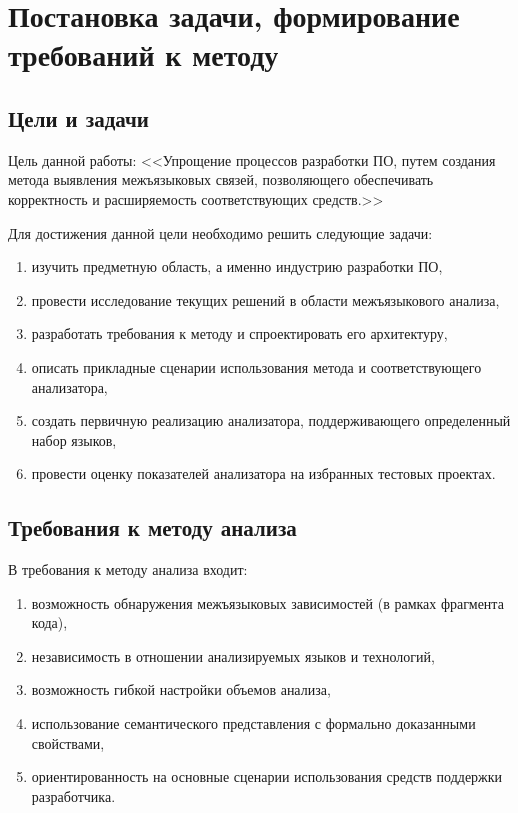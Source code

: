 \chapter{Постановка задачи, формирование требований к методу}

\section{Цели и задачи}

Цель данной работы: <<Упрощение процессов разработки ПО, путем создания метода выявления межъязыковых связей,
позволяющего обеспечивать корректность и расширяемость соответствующих средств.>>

Для достижения данной цели необходимо решить следующие задачи:
\begin{enumerate}[1)]
    \item изучить предметную область, а именно индустрию разработки ПО,
    \item провести исследование текущих решений в области межъязыкового анализа,
    \item разработать требования к методу и спроектировать его архитектуру,
    \item описать прикладные сценарии использования метода и соответствующего анализатора,
    \item создать первичную реализацию анализатора, поддерживающего определенный набор языков,
    \item провести оценку показателей анализатора на избранных тестовых проектах.
\end{enumerate}


\section{Требования к методу анализа}

В требования к методу анализа входит:
\begin{enumerate}[1)]
    \item возможность обнаружения межъязыковых зависимостей (в рамках фрагмента кода),
    \item независимость в отношении анализируемых языков и технологий,
    \item возможность гибкой настройки объемов анализа,
    \item использование семантического представления с формально доказанными свойствами,
    \item ориентированность на основные сценарии использования средств
    поддержки разработчика. 
\end{enumerate}

\clearpage